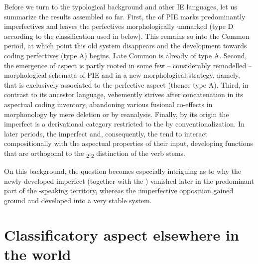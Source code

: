 \documentclass[output=paper]{langsci/langscibook}
\begin{document}
Before we turn to the typological background and other IE languages, let us summarize the results assembled so far. First, the  of PIE marks predominantly imperfectives and leaves the perfectives morphologically unmarked (type D according to the classification used in  below). This remains so into the Common  period, at which point this old system disappears and the development towards coding perfectives (type A) begins. Late Common  is already of type A. Second, the emergence of  aspect is partly rooted in some few – considerably remodelled – morphological schemata of PIE and in a new morphological strategy, namely,  that is exclusively associated to the perfective aspect (thence type A). Third, in contrast to its ancestor language,  vehemently strives after concatenation in its aspectual coding inventory, abandoning various fusional co-effects in morphonology by mere deletion or by reanalysis. Finally, by its origin the imperfect is a derivational category restricted to the  by conventionalization. In later periods, the imperfect and, consequently, the  tend to interact compositionally with the aspectual properties of their input, developing functions that are orthogonal to the \textsubscript{2}:\textsubscript{2} distinction of the verb stems.

On this background, the question becomes especially intriguing as to why the newly developed imperfect (together with the ) vanished later in the predominant part of the -speaking territory, whereas the :imper\-fec\-tive opposition gained ground and developed into a very stable system.

\section{Classificatory aspect elsewhere in the world}\label{sec:wiemerserzant:4}
\end{document}
